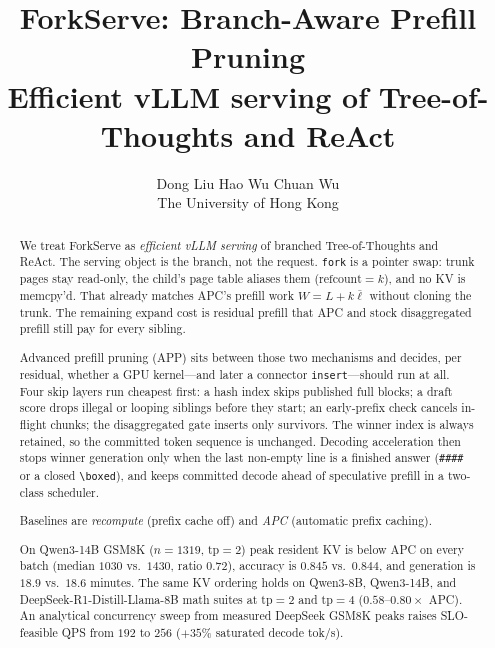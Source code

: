 \documentclass[11pt,a4paper]{article}
\title{\textbf{ForkServe: Branch-Aware Prefill Pruning}\\[0.35em]
{\large Efficient vLLM serving of Tree-of-Thoughts and ReAct}}
\author{%
\begin{tabular}[t]{c}
Dong Liu \hspace{1.4em} Hao Wu \hspace{1.4em} Chuan Wu \\[0.55em]
The University of Hong Kong
\end{tabular}%
}
\date{}
\newcommand{\app}{\textsf{APP}\xspace}
\begin{document}
\maketitle
\vspace{-1.6em}

\begin{abstract}
\noindent
We treat ForkServe as \emph{efficient vLLM serving} of branched Tree-of-Thoughts and ReAct.
The serving object is the branch, not the request.
\texttt{fork} is a pointer swap: trunk pages stay read-only, the child's page table aliases them ($\mathrm{refcount}{=}k$), and no KV is memcpy'd.
That already matches APC's prefill work $W{=}L{+}k\bar\ell$ without cloning the trunk.
The remaining expand cost is residual prefill that APC and stock disaggregated prefill still pay for every sibling.

Advanced prefill pruning (\app) sits between those two mechanisms and decides, per residual, whether a GPU kernel---and later a connector \texttt{insert}---should run at all.
Four skip layers run cheapest first: a hash index skips published full blocks; a draft score drops illegal or looping siblings before they start; an early-prefix check cancels in-flight chunks; the disaggregated gate inserts only survivors.
The winner index is always retained, so the committed token sequence is unchanged.
Decoding acceleration then stops winner generation only when the last non-empty line is a finished answer (\texttt{\#\#\#\#} or a closed \texttt{\textbackslash boxed}), and keeps committed decode ahead of speculative prefill in a two-class scheduler.

Baselines are \emph{recompute} (prefix cache off) and \emph{APC} (automatic prefix caching).

On Qwen3-14B GSM8K ($n{=}1319$, $\mathrm{tp}{=}2$) peak resident KV is below APC on every batch (median $1030$ vs.\ $1430$, ratio $0.72$), accuracy is $0.845$ vs.\ $0.844$, and generation is $18.9$ vs.\ $18.6$ minutes.
The same KV ordering holds on Qwen3-8B, Qwen3-14B, and DeepSeek-R1-Distill-Llama-8B math suites at $\mathrm{tp}{=}2$ and $\mathrm{tp}{=}4$ ($0.58$--$0.80\times$ APC).
An analytical concurrency sweep from measured DeepSeek GSM8K peaks raises SLO-feasible QPS from $192$ to $256$ ($+35\%$ saturated decode tok/s).


\end{abstract}
\end{document}
